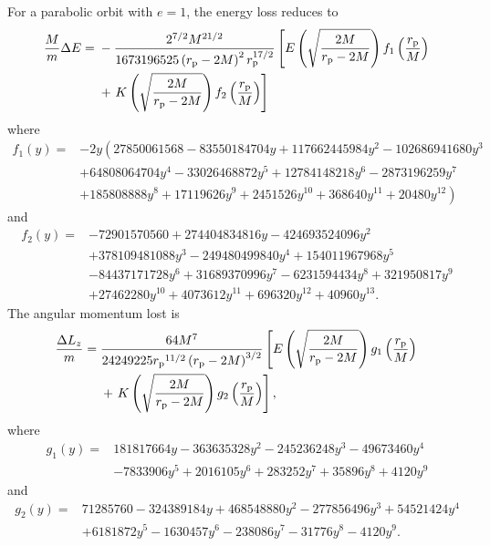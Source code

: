 For a parabolic orbit with $e = 1$, the energy loss reduces to
\begin{align}
\frac{M}{m} \Delta E = {} & -\frac{2^{7/2}M^{{21}/{2}}}{{1673196525 \left(r_\mathrm{p} - 2 M\right)^2 r_\mathrm{p}^{{17}/{2}}}} \left[E\left(\sqrt{\frac{2 M}{r_\mathrm{p} - 2 M}}\right) f_1\left(\frac{r_\mathrm{p}}{M}\right) \right. \nonumber \\* 
 {} & + \left. K\left(\sqrt{\frac{2 M}{r_\mathrm{p} - 2 M}}\right) f_2\left(\frac{r_\mathrm{p}}{M}\right)\right]
\end{align}
where
\begin{align}
f_1(y) = {} & - 2 y \left(27850061568 - 83550184704 y + 117662445984 y^2 - 102686941680 y^3  \right. \nonumber \\ 
 {} & + \left. 64808064704 y^4 - 33026468872 y^5 + 12784148218 y^6 - 2873196259 y^7 \right. \nonumber \\ 
 {} & + \left. 185808888 y^8 + 17119626 y^9 + 2451526 y^{10} + 368640 y^{11} + 20480 y^{12} \right)
\end{align}
and
\begin{align}
f_2(y) = {} & -72901570560 + 274404834816 y - 424693524096 y^2 \nonumber \\ 
 {} & + \left. 378109481088 y^3 - 249480499840 y^4 + 154011967968 y^5 \right. \nonumber \\ 
 {} & - \left. 84437171728 y^6 + 31689370996 y^7 - 6231594434 y^8 + 321950817 y^9 \right. \nonumber \\ 
 {} & + \left. 27462280 y^{10} + 4073612 y^{11} + 696320 y^{12} + 40960 y^{13}. \right.
\end{align}
The angular momentum lost is
\begin{align}
\frac{\Delta L_{z}}{m} = {} & \frac{64 M^7}{24249225 {r_\mathrm{p}}^{{11}/{2}}\left(r_\mathrm{p} - 2 M \right)^{{3}/{2}}} \left[E\left(\sqrt{\frac{2 M}{r_\mathrm{p} - 2 M}}\right) g_1\left(\frac{r_\mathrm{p}}{M}\right) \right. \nonumber \\*
 {} & + \left.  K\left(\sqrt{\frac{2 M}{r_\mathrm{p} - 2 M}}\right) g_2\left(\frac{r_\mathrm{p}}{M}\right)\right],
\end{align}
where
\begin{align}
g_1(y) = {} & 181817664 y - 363635328 y^2 - 245236248 y^3 - 49673460 y^4  \nonumber \\
 {} & - \left. 7833906 y^5 + 2016105 y^6 + 283252 y^7 + 35896 y^8 + 4120 y^9 \right.
\end{align}
and
\begin{align}
g_2(y) = {} & 71285760 - 324389184 y + 468548880 y^2 - 277856496 y^3 + 54521424 y^4 \nonumber \\
 {} & + \left. 6181872 y^5 - 1630457 y^6 - 238086 y^7 - 31776 y^8 - 4120 y^9. \right.
\end{align}
